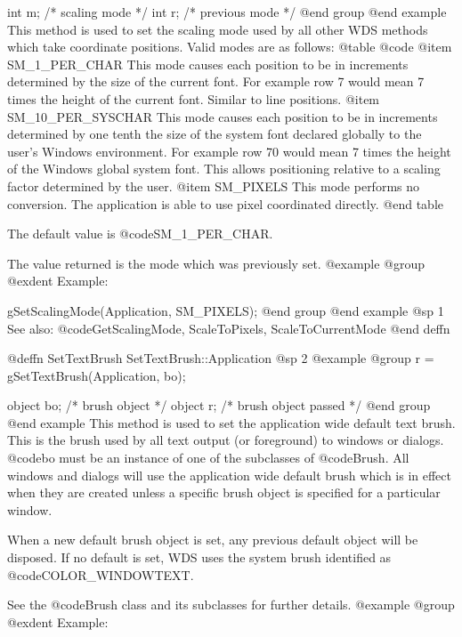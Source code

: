 int     m;      /*  scaling mode   */
int     r;      /*  previous mode  */
@end group
@end example
This method is used to set the scaling mode used by all other WDS methods
which take coordinate positions.  Valid modes are as follows:
@table @code
@item SM_1_PER_CHAR
This mode causes each position to be in increments determined by the
size of the current font.  For example row 7 would mean 7 times the
height of the current font.  Similar to line positions.
@item SM_10_PER_SYSCHAR
This mode causes each position to be in increments determined by one
tenth the size of the system font declared globally to the user's
Windows environment.  For example row 70 would mean 7 times the height
of the Windows global system font.  This allows positioning relative
to a scaling factor determined by the user.
@item SM_PIXELS
This mode performs no conversion.  The application is able to use
pixel coordinated directly.
@end table

The default value is @code{SM_1_PER_CHAR}.

The value returned is the mode which was previously set.
@example
@group
@exdent Example:

gSetScalingMode(Application, SM_PIXELS);
@end group
@end example
@sp 1
See also:  @code{GetScalingMode, ScaleToPixels, ScaleToCurrentMode}
@end deffn














@deffn {SetTextBrush} SetTextBrush::Application
@sp 2
@example
@group
r = gSetTextBrush(Application, bo);

object  bo;     /*  brush object         */
object  r;      /*  brush object passed  */
@end group
@end example
This method is used to set the application wide default text brush.
This is the brush used by all text output (or foreground) to windows or
dialogs.  @code{bo} must be an instance of one of the subclasses of
@code{Brush}.  All windows and dialogs will use the application wide
default brush which is in effect when they are created unless a specific
brush object is specified for a particular window.

When a new default brush object is set, any previous default object
will be disposed.  If no default is set, WDS uses the system brush
identified as @code{COLOR_WINDOWTEXT}.

See the @code{Brush} class and its subclasses for further details.
@example
@group
@exdent Example:

